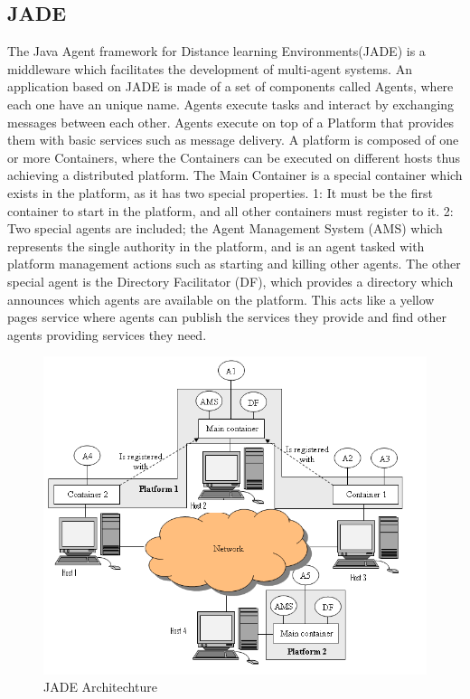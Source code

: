  \subsection{JADE}
 The Java Agent framework for Distance learning Environments(JADE) is a middleware which facilitates the development of multi-agent systems. An application based on JADE is made of a set of components called Agents, where each one have an unique name. Agents execute tasks and interact by exchanging messages between each other. Agents execute on top of a Platform that provides them with basic services such as message delivery. A platform is composed of one or more Containers, where the Containers can be executed on different hosts thus achieving a distributed platform. The Main Container is a special container which exists in the platform, as it has two special properties. 1: It must be the first container to start in the platform, and all other containers must register to it. 2: Two special agents are included; the Agent Management System (AMS) which represents the single authority in the platform, and is an agent tasked with platform management actions such as starting and killing other agents. The other special agent is the Directory Facilitator (DF), which provides a directory which announces which agents are available on the platform. This acts like a yellow pages service where agents can publish the services they provide and find other agents providing services they need.
 
 \begin{figure}[h!]
 	\centering
	 	\includegraphics[width=\textwidth]{fig/jadeArchitecture}
	 	\caption{JADE Architechture}
	 	\label{fig:JADEarchitechture}
 \end{figure}


